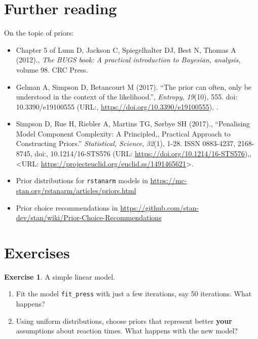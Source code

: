 \documentclass[12pt,]{krantz}
\providecommand{\tightlist}{%
  \setlength{\itemsep}{0pt}\setlength{\parskip}{0pt}}
\theoremstyle{definition}
\theoremstyle{definition}
\theoremstyle{definition}
\newtheorem{exercise}{Exercise}[chapter]
\theoremstyle{remark}
\begin{document}
\section{Further reading}\label{further-reading-2}

On the topic of priors:

\begin{itemize}
\tightlist
\item
  Chapter 5 of Lunn D, Jackson C, Spiegelhalter DJ, Best N, Thomas A
  (2012)., \emph{The BUGS book: A practical introduction to Bayesian,
  analysis}, volume 98. CRC Press.
\item
  Gelman A, Simpson D, Betancourt M (2017). ``The prior can often, only
  be understood in the context of the likelihood.'', \emph{Entropy},
  \emph{19}(10), 555. doi: 10.3390/e19100555 (URL:,
  \url{https://doi.org/10.3390/e19100555}), .
\item
  Simpson D, Rue H, Riebler A, Martins TG, Sørbye SH (2017).,
  ``Penalising Model Component Complexity: A Principled,, Practical
  Approach to Constructing Priors.'' \emph{Statistical, Science},
  \emph{32}(1), 1-28. ISSN 0883-4237, 2168-8745, doi:, 10.1214/16-STS576
  (URL: \url{https://doi.org/10.1214/16-STS576}),, \textless{}URL:
  \url{https://projecteuclid.org/euclid.ss/1491465621}\textgreater{}.
\item
  Prior distributions for \texttt{rstanarm} models in
  \url{https://mc-stan.org/rstanarm/articles/priors.html}
\item
  Prior choice recommendations in
  \url{https://github.com/stan-dev/stan/wiki/Prior-Choice-Recommendations}
\end{itemize}

\section{Exercises}\label{ex:compbda}

\begin{exercise}
\protect\hypertarget{exr:linearmod}{}{\label{exr:linearmod} }A simple linear
model. \end{exercise}

\vspace{-.5cm}

\begin{enumerate}
\def\labelenumi{\alph{enumi}.}
\tightlist
\item
  Fit the model \texttt{fit\_press} with just a few iterations, say 50
  iterations. What happens?
\item
  Using uniform distributions, choose priors that represent better
  \textbf{your} assumptions about reaction times. What happens with the
  new model?
\end{enumerate}
\end{document}
